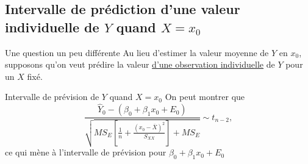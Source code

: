 \documentclass{BeamerTemplate}
\begin{document}
\subsection[IP($Y_0$)]{Intervalle de prédiction d'une valeur individuelle de $Y$ quand $X=x_0$}

\begin{frame}[t]{Une question un peu différente}
Au lieu d'estimer la valeur moyenne de $Y$ en $x_0$, supposons qu'on veut \alert{prédire la valeur \underline{d'une observation individuelle} de $Y$} pour un $X$ fixé.

\medskip
{}
\end{frame}

\begin{frame}[t]{Intervalle de prévision de $Y$ quand $X=x_0$}
On peut montrer que
$$\frac{\hat{Y}_0-(\beta_0+\beta_1x_0+E_0)}{\sqrt{MS_E\left[\frac{1}{n}+\frac{(x_0-\overline{X})^2}{S_{XX}}\right]+MS_E}}\sim t_{n-2},
$$
ce qui mène à l'intervalle de prévision pour $\beta_0+\beta_1x_0+E_0$
{}
\end{frame}
\end{document}
